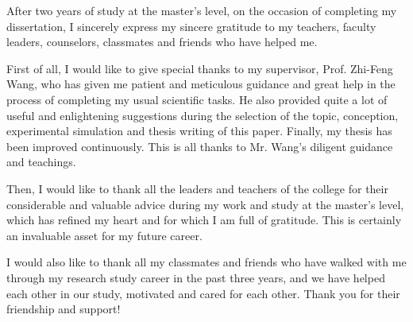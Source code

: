 
\begin{acknowledgments}





    After two years of study at the master's level, on the occasion of completing my dissertation, I sincerely express my sincere gratitude to my teachers, faculty leaders, counselors, classmates and friends who have helped me.

    First of all, I would like to give special thanks to my supervisor, Prof. Zhi-Feng Wang, who has given me patient and meticulous guidance and great help in the process of completing my usual scientific tasks. He also provided quite a lot of useful and enlightening suggestions during the selection of the topic, conception, experimental simulation and thesis writing of this paper. Finally, my thesis has been improved continuously. This is all thanks to Mr. Wang's diligent guidance and teachings.

    Then, I would like to thank all the leaders and teachers of the college for their considerable and valuable advice during my work and study at the master's level, which has refined my heart and for which I am full of gratitude. This is certainly an invaluable asset for my future career.

    I would also like to thank all my classmates and friends who have walked with me through my research study career in the past three years, and we have helped each other in our study, motivated and cared for each other. Thank you for their friendship and support!

\end{acknowledgments}
